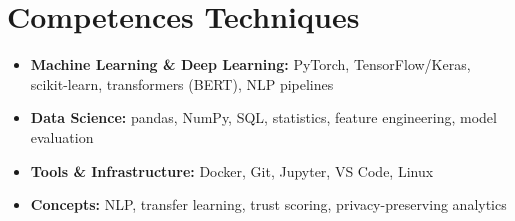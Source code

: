 \documentclass[a4paper,11pt]{article}
\begin{document}
\section{Competences Techniques}
\begin{itemize}[leftmargin=*, nosep]
    \item \small{\textbf{Machine Learning \& Deep Learning:} PyTorch, TensorFlow/Keras, scikit-learn, transformers (BERT), NLP pipelines}
    \item \small{\textbf{Data Science:} pandas, NumPy, SQL, statistics, feature engineering, model evaluation}
    \item \small{\textbf{Tools \& Infrastructure:} Docker, Git, Jupyter, VS Code, Linux}
    \item \small{\textbf{Concepts:} NLP, transfer learning, trust scoring, privacy-preserving analytics}
\end{itemize}
\end{document}

